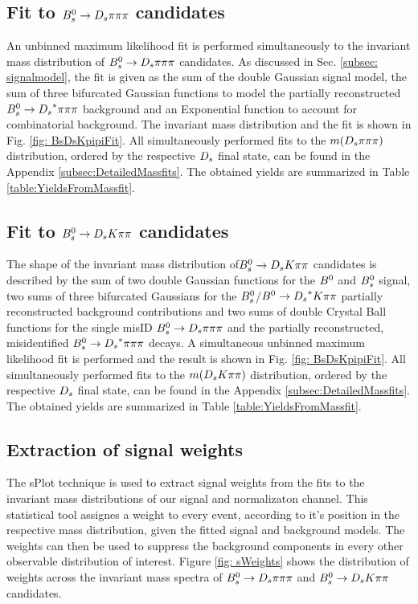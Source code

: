 \subsection{Fit to ${{B}^0_{s}}\rightarrow{\ensuremath{{D}_{s}}}{\ensuremath{\pi}}{\ensuremath{\pi}}{\ensuremath{\pi}}$ candidates}
\label{subsec: NormFit}

An unbinned maximum likelihood fit is performed simultaneously to the invariant mass distribution of ${{B}^0_{s}}\rightarrow{\ensuremath{{D}_{s}}}{\ensuremath{\pi}}{\ensuremath{\pi}}{\ensuremath{\pi}}$ candidates. 
As discussed in Sec. \ref{subsec: signalmodel}, the fit is given as the sum of the double Gaussian signal model, the sum of three bifurcated Gaussian functions to model the partially reconstructed ${{B}^0_{s}}\rightarrow{\ensuremath{{D}_{s}}}^{*}{\pi}{\pi}{\pi}$ background and an Exponential function to account for combinatorial background. The invariant mass distribution and the fit is shown in Fig. \ref{fig: BsDsKpipiFit}. 
All simultaneously performed fits to the $m({{D}_{s}}{\pi}{\pi}{\pi})$ distribution, ordered by the respective ${{D}_{s}}$ final state, can be found in the Appendix \ref{subsec:DetailedMassfits}.   
The obtained yields are summarized in Table \ref{table:YieldsFromMassfit}. 


\subsection{Fit to ${{B}^0_{s}}\rightarrow{\ensuremath{{D}_{s}}}{\ensuremath{K}}{\ensuremath{\pi}}{\ensuremath{\pi}}$ candidates}
\label{subsec: SigFit}

The shape of the invariant mass distribution of${{B}^0_{s}}\rightarrow{\ensuremath{{D}_{s}}}{\ensuremath{K}}{\ensuremath{\pi}}{\ensuremath{\pi}}$ candidates is described by the sum of two double Gaussian functions for the ${{B}^0}$ and ${{B}^0_{s}}$ signal, 
two sums of three bifurcated Gaussians for the ${{B}^0_{s}}$/${{B}^0}\rightarrow{\ensuremath{{D}_{s}}}^{*}{K}{\pi}{\pi}$ partially reconstructed background contributions and 
two sums of double Crystal Ball functions for the single misID ${{B}^0_{s}}\rightarrow{\ensuremath{{D}_{s}}}{\ensuremath{\pi}}{\ensuremath{\pi}}{\ensuremath{\pi}}$ and the partially reconstructed, misidentified ${{B}^0_{s}}\rightarrow{\ensuremath{{D}_{s}}}^{*}{\pi}{\pi}{\pi}$ decays. 
A simultaneous unbinned maximum likelihood fit is performed and the result is shown in Fig. \ref{fig: BsDsKpipiFit}.
All simultaneously performed fits to the $m({{D}_{s}}{K}{\pi}{\pi})$ distribution, ordered by the respective ${{D}_{s}}$ final state, can be found in the Appendix \ref{subsec:DetailedMassfits}.
The obtained yields are summarized in Table \ref{table:YieldsFromMassfit}.
 

\subsection{Extraction of signal weights}
\label{subsec: sWegihts}

The sPlot technique \cite{Pivk:2004ty} is used to extract signal weights from the fits to the invariant mass distributions of our signal and normalizaton channel. 
This statistical tool assignes a weight to every event, according to it's position in the respective mass distribution, given the fitted signal and background models. 
The weights can then be used to suppress the background components in every other observable distribution of interest.  
Figure \ref{fig: sWeights} shows the distribution of weights across the invariant mass spectra of ${{B}^0_{s}}\rightarrow{\ensuremath{{D}_{s}}}{\ensuremath{\pi}}{\ensuremath{\pi}}{\ensuremath{\pi}}$ and ${{B}^0_{s}}\rightarrow{\ensuremath{{D}_{s}}}{\ensuremath{K}}{\ensuremath{\pi}}{\ensuremath{\pi}}$ candidates.


